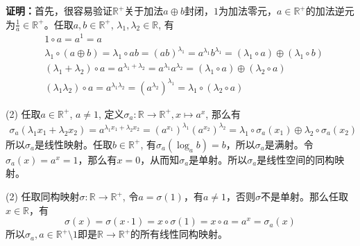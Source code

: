 {\bf 证明：}首先，很容易验证$\mathbb{R}^+$关于加法$a\oplus b$封闭，$1$为加法零元，$a\in\mathbb{R}^+$的加法逆元为$\frac{1}{a}\in\mathbb{R}^+$。任取$a,b\in\mathbb{R}^+$, $\lambda_1,\lambda_2\in\mathbb{R}$, 有
\begin{align*}
& 1\circ a = a^1 = a \\
& \lambda_1 \circ (a\oplus b) = \lambda_1 \circ ab = (ab)^{\lambda_1} = a^{\lambda_1} b^{\lambda_1} = (\lambda_1\circ a) \oplus (\lambda_1\circ b) \\
& (\lambda_1 + \lambda_2) \circ a = a^{\lambda_1 + \lambda_2} = a^{\lambda_1} a^{\lambda_2} = (\lambda_1 \circ a) \oplus (\lambda_2 \circ a) \\
& (\lambda_1\lambda_2)\circ a = a^{\lambda_1\lambda_2} = (a^{\lambda_2})^{\lambda_1} = \lambda_1 \circ (\lambda_2 \circ a)
\end{align*}

(2) 任取$a\in\mathbb{R}^{+}$, $a \neq 1$, 定义$\sigma_a: \mathbb{R} \to \mathbb{R}^{+}, x \mapsto a^x$, 那么有
\begin{align*}
\sigma_a(\lambda_1x_1 + \lambda_2x_2) = a^{\lambda_1x_1 + \lambda_2x_2} = (a^{x_1})^{\lambda_1} (a^{x_2})^{\lambda_2} = \lambda_1\circ \sigma_a(x_1) \oplus \lambda_2\circ \sigma_a(x_2)
\end{align*}
所以$\sigma_a$是线性映射。任取$b\in\mathbb{R}^{+}$, 有$\sigma_a(\log_a b) = b$，所以$\sigma_a$是满射。令$\sigma_a(x) = a^x = 1$，那么有$x = 0$，从而知$\sigma_a$是单射。所以$\sigma_a$是线性空间的同构映射。

(2) 任取同构映射$\sigma: \mathbb{R} \to \mathbb{R}^{+}$, 令$a = \sigma(1)$，有$a\neq 1$，否则$\sigma$不是单射。那么任取$x\in\mathbb{R}$，有
$$\sigma(x) = \sigma(x\cdot 1) = x \circ \sigma(1) = x \circ a = a^{x} = \sigma_a(x)$$
所以$\sigma_a, a\in\mathbb{R}^{+} \setminus {1}$即是$\mathbb{R} \to \mathbb{R}^{+}$的所有线性同构映射。


